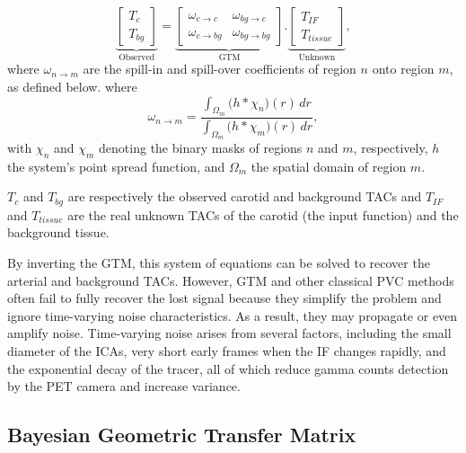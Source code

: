 \begin{equation}
	\underbrace{
		\begin{bmatrix}
			T_{c} \\
			T_{bg}
		\end{bmatrix}
	}_{\text{Observed}}
	=
	\underbrace{
		\begin{bmatrix}
			\omega_{c \rightarrow c}  & \omega_{bg \rightarrow c}  \\
			\omega_{c \rightarrow bg} & \omega_{bg \rightarrow bg}
		\end{bmatrix}
	}_{\text{GTM}}
	.
	\underbrace{
		\begin{bmatrix}
			T_{IF} \\
			T_{tissue}
		\end{bmatrix}
	}_{\text{Unknown}},
\end{equation}
where $\omega_{n \rightarrow m}$ are the spill-in and spill-over coefficients of region $n$ onto region $m$, as defined below. %
where
\begin{equation}
	\omega_{n\to m} = \frac{\displaystyle \int_{\Omega_m} \bigl( h \ast \chi_n \bigr)(r)\,dr}{\displaystyle \int_{\Omega_m} \bigl( h \ast \chi_m \bigr)(r)\,dr},
\end{equation}
with \(\chi_n\) and \(\chi_m\) denoting the binary masks of regions \(n\) and \(m\), respectively, \(h\) the system's point spread function, and \(\Omega_m\) the spatial domain of region \(m\).

$T_{c}$ and $T_{bg}$ are respectively the observed carotid and background TACs and $T_{IF}$ and $T_{tissue}$ are the real unknown TACs of the carotid (the input function) and the background tissue.

By inverting the GTM, this system of equations can be solved to recover the arterial and background TACs.
However, GTM and other classical PVC methods often fail to fully recover the lost signal because they simplify the problem and ignore time-varying noise characteristics.
As a result, they may propagate or even amplify noise.
Time-varying noise arises from several factors, including the small diameter of the ICAs, very short early frames when the IF changes rapidly, and the exponential decay of the tracer, all of which reduce gamma counts detection by the PET camera and increase variance.

\subsection{Bayesian Geometric Transfer Matrix}

